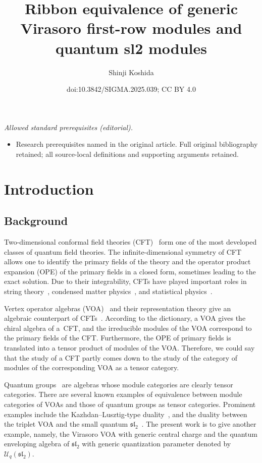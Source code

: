 \documentclass[10pt,a4paper]{amsart}
\title{Ribbon equivalence of generic Virasoro first-row modules and quantum sl2 modules}
\author{Shinji Koshida}
\date{doi:10.3842/SIGMA.2025.039; CC BY 4.0}
\numberwithin{equation}{section}
\newcommand{\cU}{\mathcal{U}}
\newcommand{\fsl}{\mathfrak{sl}}
\newcommand{\UEA}{\cU}
\newcommand{\Uq}{\UEA_{q}}
\begin{document}
\maketitle
\noindent\textit{Allowed standard prerequisites (editorial).}\begin{itemize}
\item Research prerequisites named in the original article. Full original bibliography retained; all source-local definitions and supporting arguments retained.
\end{itemize}\medskip
\section{Introduction}
\subsection{Background}
Two-dimensional conformal field theories (CFT)~\cite{BPZ1984b,DMS_yellow_CFT} form one of the most developed classes of quantum field theories.
The infinite-dimensional symmetry of CFT allows one to identify the primary fields of the theory and the operator product expansion (OPE) of the primary fields in a closed form, sometimes leading to the exact solution.
Due to their integrability, CFTs have played important roles in string theory~\cite{GreenSchwarzWitten_superstring}, condensed matter physics~\cite{Hansson_QHall_CFT,Ludwig_CFT_condensed_matter}, and statistical physics~\cite{Cardy_lecture_2008,Mussardo-statistical_field_theory}.

Vertex operator algebras (VOA)~\cite{FLM-VOAs_Monster,Lepowsky_Li-VOA} and their representation theory give an algebraic counterpart of CFTs~\cite{Huang-CFT_and_VOA}.
According to the dictionary, a VOA gives the chiral algebra of a~CFT, and the irreducible modules of the VOA correspond to the primary fields of the CFT.
Furthermore, the OPE of primary fields is translated into a tensor product of modules of the VOA.
Therefore, we could say that the study of a CFT partly comes down to the study of the category of modules of the corresponding VOA as a tensor category.

Quantum groups~\cite{Drinfeld1986} are algebras whose module categories are clearly tensor categories.
There are several known examples of equivalence between module categories of VOAs and those of quantum groups as tensor categories.
Prominent examples include the Kazhdan--Lusztig-type duality~\cite{Drinfeld1989,Finkelberg1996,KL-tensor_structures_affine_Lie-I,KL-tensor_structures_affine_Lie-II,KL-tensor_structures_affine_Lie-III,KL-tensor_structures_affine_Lie-IV,McRae-nonneg_integer_level_affine_Lie_algebra_tensor_cat}, and the duality between the triplet VOA and the small quantum $\fsl_{2}$~\cite{CreutzigLentnerRupert,FeiginGainutdinovSemikhatovTipunin2006a,FeiginGainutdinovSemikhatovTipunin2006b,GannonNegron-quantum_sltwo_and_log_VOAs,KondoSaito2011, NagatomoTsuchiya2011,TsuchiyaWood2013}.
The present work is to give another example, namely, the Virasoro VOA with generic central charge and the quantum enveloping algebra of $\fsl_{2}$ with generic quantization parameter denoted by $\Uq(\fsl_{2})$.
\end{document}
